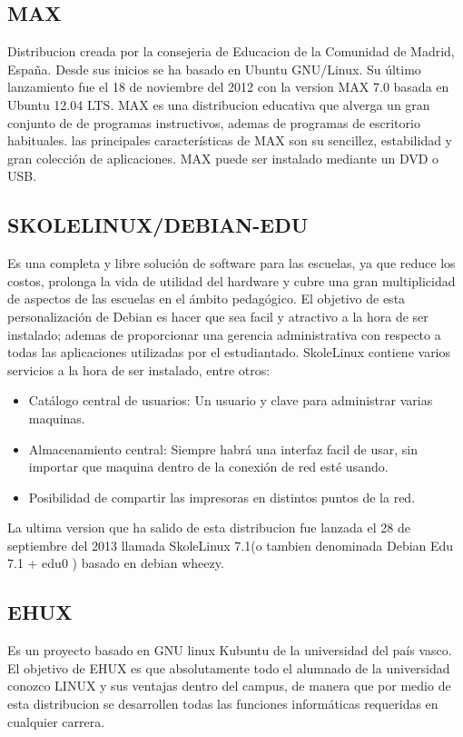 \subsection*{MAX}

Distribucion creada por la consejeria de Educacion de la
Comunidad de Madrid, España. Desde sus inicios se ha basado
en Ubuntu GNU/Linux. Su último lanzamiento fue el 18 de
noviembre del 2012 con la version MAX 7.0 basada en Ubuntu
12.04 LTS.
MAX es una distribucion educativa que alverga un gran conjunto
de de programas instructivos, ademas de programas de
escritorio habituales.
las principales características de MAX son su sencillez,
estabilidad y gran colección de aplicaciones.
MAX puede ser instalado mediante un DVD o USB.

\subsection*{SKOLELINUX/DEBIAN-EDU}
Es una completa y libre solución de
software para las escuelas, ya que reduce los costos, prolonga la
vida de utilidad del hardware y cubre una gran multiplicidad de
aspectos de las escuelas en el ámbito pedagógico.
El objetivo de esta personalización de Debian es hacer que sea
facil y atractivo a la hora de ser instalado; ademas de
proporcionar una gerencia administrativa con respecto a todas
las aplicaciones utilizadas por el estudiantado.
SkoleLinux contiene varios servicios a la hora de ser instalado,
entre otros:
\begin{itemize}
  \item Catálogo central de usuarios: Un usuario y clave para
        administrar varias maquinas.
  \item Almacenamiento central: Siempre habrá una interfaz facil de usar, sin importar que maquina dentro de la conexión de red esté usando.
  \item Posibilidad de compartir las impresoras en distintos puntos de la red.
\end{itemize}

La ultima version que ha salido de esta distribucion fue lanzada
el 28 de septiembre del 2013 llamada SkoleLinux 7.1(o tambien
denominada Debian Edu 7.1 + edu0 ) basado en debian wheezy.

\subsection*{EHUX}
Es un proyecto basado en GNU linux Kubuntu de la
universidad del país vasco.
El objetivo de EHUX es que absolutamente todo el alumnado de
la universidad conozco LINUX y sus ventajas dentro del campus,
de manera que por medio de esta distribucion se desarrollen
todas las funciones informáticas requeridas en cualquier
carrera.

